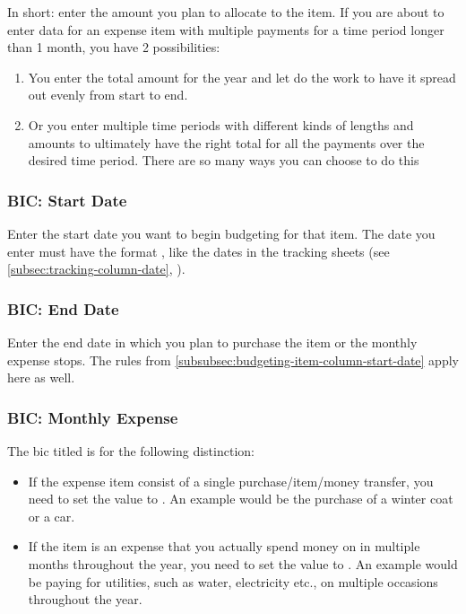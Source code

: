 In short: enter the amount you plan to allocate to the item.
If you are about to enter data for an expense item with multiple payments for a time period longer than 1 month, you have 2 possibilities:
\begin{enumerate}
	\item You enter the total amount for the year and let \tfn do the work to have it spread out evenly from start to end.
	\item Or you enter multiple time periods with different kinds of lengths and amounts to ultimately have the right total for all the payments over the desired time period.
	There are so many ways you can choose to do this
\end{enumerate}

\subsubsection{BIC: Start Date}
\label{subsubsec:budgeting-item-column-start-date}

Enter the start date you want to begin budgeting for that item.
The date you enter must have the format , like the dates in the tracking sheets (see \autoref{subsec:tracking-column-date}, ).

\subsubsection{BIC: End Date}
\label{subsubsec:budgeting-item-column-end-date}

Enter the end date in which you plan to purchase the item or the monthly expense stops.
The rules from \autoref{subsubsec:budgeting-item-column-start-date} apply here as well.

\subsubsection{BIC: Monthly Expense}
\label{subsubsec:budgeting-item-column-monthly-expense}

The \ac{bic} titled  is for the following distinction:
\begin{itemize}
	\item If the expense item consist of a single purchase/item/money transfer, you need to set the value to .
	An example would be the purchase of a winter coat or a car.
	\item If the item is an expense that you actually spend money on in multiple months throughout the year, you need to set the value to .
	An example would be paying for \eg utilities, such as water, electricity etc., on multiple occasions throughout the year.
\end{itemize}

